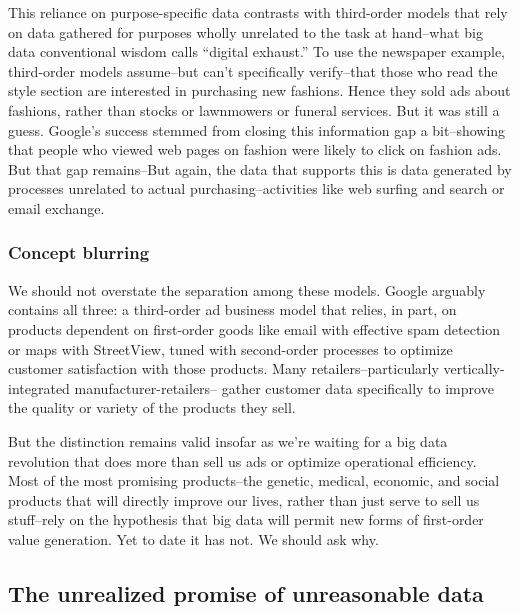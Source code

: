 \documentclass[12pt]{article}
\begin{document}
This reliance on purpose-specific data contrasts with third-order
models that rely on data gathered for purposes wholly unrelated to the
task at hand--what big data conventional wisdom calls ``digital
exhaust.'' To use the newspaper example, third-order models
assume--but can't specifically verify--that those who read the style
section are interested in purchasing new fashions. Hence they sold ads
about fashions, rather than stocks or lawnmowers or funeral
services. But it was still a guess. Google's success stemmed from
closing this information gap a bit--showing that people who viewed web
pages on fashion were likely to click on fashion ads. But that gap remains--But again, the
data that supports this is data generated by processes unrelated to
actual purchasing--activities like web surfing and search or email
exchange. 


\subsubsection{Concept blurring}
\label{sec:concept-blurring}

We should not overstate the separation among these models. Google
arguably contains all three: a third-order ad business model that
relies, in part, on products dependent on first-order goods like email
with effective spam detection or maps with StreetView, tuned with
second-order processes to optimize customer satisfaction with those
products. Many retailers--particularly vertically-integrated
manufacturer-retailers-- gather customer data specifically to improve
the quality or variety of the products they sell.

But the distinction remains valid insofar as we're waiting for a big
data revolution that does more than sell us ads or optimize
operational efficiency. Most of the most promising products--the
genetic, medical, economic, and social products that will directly
improve our lives, rather than just serve to sell us stuff--rely on
the hypothesis that big data will permit new forms of first-order
value generation. Yet to date it has not. We should ask why. 

\subsection{The unrealized promise of unreasonable data}
\label{sec:unre-prom-unre}
\end{document}
